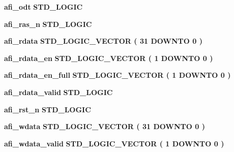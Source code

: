 \begin{DoxyCompactItemize}
\item 
{\bf afi\+\_\+odt} {\bfseries \textcolor{comment}{S\+T\+D\+\_\+\+L\+O\+G\+IC}\textcolor{vhdlchar}{ }} 
\item 
{\bf afi\+\_\+ras\+\_\+n} {\bfseries \textcolor{comment}{S\+T\+D\+\_\+\+L\+O\+G\+IC}\textcolor{vhdlchar}{ }} 
\item 
{\bf afi\+\_\+rdata} {\bfseries \textcolor{comment}{S\+T\+D\+\_\+\+L\+O\+G\+I\+C\+\_\+\+V\+E\+C\+T\+OR}\textcolor{vhdlchar}{ }\textcolor{vhdlchar}{(}\textcolor{vhdlchar}{ }\textcolor{vhdlchar}{ } \textcolor{vhdldigit}{31} \textcolor{vhdlchar}{ }\textcolor{keywordflow}{D\+O\+W\+N\+TO}\textcolor{vhdlchar}{ }\textcolor{vhdlchar}{ } \textcolor{vhdldigit}{0} \textcolor{vhdlchar}{ }\textcolor{vhdlchar}{)}\textcolor{vhdlchar}{ }} 
\item 
{\bf afi\+\_\+rdata\+\_\+en} {\bfseries \textcolor{comment}{S\+T\+D\+\_\+\+L\+O\+G\+I\+C\+\_\+\+V\+E\+C\+T\+OR}\textcolor{vhdlchar}{ }\textcolor{vhdlchar}{(}\textcolor{vhdlchar}{ }\textcolor{vhdlchar}{ } \textcolor{vhdldigit}{1} \textcolor{vhdlchar}{ }\textcolor{keywordflow}{D\+O\+W\+N\+TO}\textcolor{vhdlchar}{ }\textcolor{vhdlchar}{ } \textcolor{vhdldigit}{0} \textcolor{vhdlchar}{ }\textcolor{vhdlchar}{)}\textcolor{vhdlchar}{ }} 
\item 
{\bf afi\+\_\+rdata\+\_\+en\+\_\+full} {\bfseries \textcolor{comment}{S\+T\+D\+\_\+\+L\+O\+G\+I\+C\+\_\+\+V\+E\+C\+T\+OR}\textcolor{vhdlchar}{ }\textcolor{vhdlchar}{(}\textcolor{vhdlchar}{ }\textcolor{vhdlchar}{ } \textcolor{vhdldigit}{1} \textcolor{vhdlchar}{ }\textcolor{keywordflow}{D\+O\+W\+N\+TO}\textcolor{vhdlchar}{ }\textcolor{vhdlchar}{ } \textcolor{vhdldigit}{0} \textcolor{vhdlchar}{ }\textcolor{vhdlchar}{)}\textcolor{vhdlchar}{ }} 
\item 
{\bf afi\+\_\+rdata\+\_\+valid} {\bfseries \textcolor{comment}{S\+T\+D\+\_\+\+L\+O\+G\+IC}\textcolor{vhdlchar}{ }} 
\item 
{\bf afi\+\_\+rst\+\_\+n} {\bfseries \textcolor{comment}{S\+T\+D\+\_\+\+L\+O\+G\+IC}\textcolor{vhdlchar}{ }} 
\item 
{\bf afi\+\_\+wdata} {\bfseries \textcolor{comment}{S\+T\+D\+\_\+\+L\+O\+G\+I\+C\+\_\+\+V\+E\+C\+T\+OR}\textcolor{vhdlchar}{ }\textcolor{vhdlchar}{(}\textcolor{vhdlchar}{ }\textcolor{vhdlchar}{ } \textcolor{vhdldigit}{31} \textcolor{vhdlchar}{ }\textcolor{keywordflow}{D\+O\+W\+N\+TO}\textcolor{vhdlchar}{ }\textcolor{vhdlchar}{ } \textcolor{vhdldigit}{0} \textcolor{vhdlchar}{ }\textcolor{vhdlchar}{)}\textcolor{vhdlchar}{ }} 
\item 
{\bf afi\+\_\+wdata\+\_\+valid} {\bfseries \textcolor{comment}{S\+T\+D\+\_\+\+L\+O\+G\+I\+C\+\_\+\+V\+E\+C\+T\+OR}\textcolor{vhdlchar}{ }\textcolor{vhdlchar}{(}\textcolor{vhdlchar}{ }\textcolor{vhdlchar}{ } \textcolor{vhdldigit}{1} \textcolor{vhdlchar}{ }\textcolor{keywordflow}{D\+O\+W\+N\+TO}\textcolor{vhdlchar}{ }\textcolor{vhdlchar}{ } \textcolor{vhdldigit}{0} \textcolor{vhdlchar}{ }\textcolor{vhdlchar}{)}\textcolor{vhdlchar}{ }} 

\end{DoxyCompactItemize}
